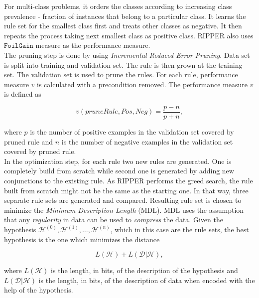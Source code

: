 For multi-class problems, it orders the classes according to increasing class prevalence - fraction of instances that belong to a particular class. It learns the rule set for the smallest class first and treats other classes as negative. It then repeats the process taking next smallest class as positive class. RIPPER also uses $\mathtt{FoilGain}$ measure as the performance measure.\\

The pruning step is done by using \textit{Incremental Reduced Error Pruning}. Data set is split into training and validation set. The rule is then grown at the training set. The validation set is used to prune the rules. For each rule, performance measure $v$ is calculated with a precondition removed. The performance measure $v$ is defined as 

\begin{equation}
	v(pruneRule, Pos, Neg) = \frac{p - n}{p + n},
\end{equation}

where $p$ is the number of positive examples in the validation set covered by pruned rule and $n$ is the number of negative examples in the validation set covered by pruned rule. \\

In the optimization step, for each rule two new rules are generated. One is completely build from scratch while second one is generated by adding new conjunctions to the existing rule. As RIPPER performs the greed search, the rule built from scratch might not be the same as the starting one. In that way, three separate rule sets are generated and compared. Resulting rule set is chosen to minimize the \textit{Minimum Description Length} (MDL). MDL uses the assumption that any \textit{regularity} in data can be used to \textit{compress} the data. Given the hypothesis $\mathcal{H}^{(0)}, \mathcal{H}^{(1)}, \ldots, \mathcal{H}^{(n)}$, which in this case are the rule sets, the best hypothesis is the one which minimizes the distance 

\begin{equation}
	L(\mathcal{H}) + L(\mathcal{D} | \mathcal{H}),
\end{equation}

where $L(\mathcal{H})$ is the length, in bits, of the description of the hypothesis and $L(\mathcal{D} | \mathcal{H})$ is the length, in bits, of the description of data when encoded with the help of the hypothesis.


